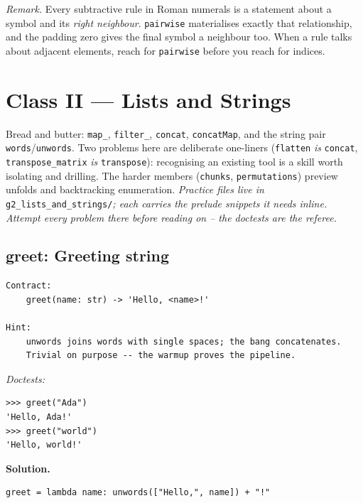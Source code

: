 \documentclass[11pt,letterpaper]{book}
\begin{document}
\noindent\textit{Remark.} Every subtractive rule in Roman numerals is a statement about
a symbol and its \emph{right neighbour}. \texttt{pairwise} materialises exactly
that relationship, and the padding zero gives the final symbol a neighbour too.
When a rule talks about adjacent elements, reach for \texttt{pairwise} before you
reach for indices.
\chapter{Class II --- Lists and Strings}

Bread and butter: \texttt{map\_}, \texttt{filter\_}, \texttt{concat},
\texttt{concatMap}, and the string pair \texttt{words}/\texttt{unwords}. Two
problems here are deliberate one-liners (\texttt{flatten} \emph{is}
\texttt{concat}, \texttt{transpose\_matrix} \emph{is} \texttt{transpose}):
recognising an existing tool is a skill worth isolating and drilling. The
harder members (\texttt{chunks}, \texttt{permutations}) preview unfolds and
backtracking enumeration.
\medskip\noindent\textit{Practice files live in }\texttt{g2\_lists\_and\_strings/}\textit{;
each carries the prelude snippets it needs inline. Attempt every problem there
before reading on -- the doctests are the referee.}

\section{greet: Greeting string}
\begin{lstlisting}[style=spec]
Contract:
    greet(name: str) -> 'Hello, <name>!'

Hint:
    unwords joins words with single spaces; the bang concatenates.
    Trivial on purpose -- the warmup proves the pipeline.
\end{lstlisting}
\noindent\textit{Doctests:}
\begin{lstlisting}[style=spec]
>>> greet("Ada")
'Hello, Ada!'
>>> greet("world")
'Hello, world!'
\end{lstlisting}
\noindent\textbf{Solution.}
\begin{lstlisting}[style=code]
greet = lambda name: unwords(["Hello,", name]) + "!"
\end{lstlisting}
\end{document}
